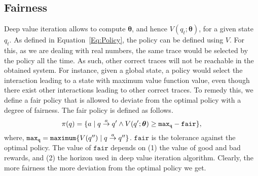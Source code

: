 


\subsection{Fairness}
Deep value iteration allows to compute $\bm{\theta}$, and hence $V(q_{t};\bm{\theta})$, for a given state $q_t$. As defined in Equation~\ref{Eq:Policy}, the policy can be defined using $V$. For this, as we are dealing with real numbers, the same trace would be selected by the policy all the time. As such, other correct traces will not be reachable in the obtained system. For instance, given a global state, a policy would select the interaction leading to a state with maximum value function value, even though there exist other interactions leading to other correct traces. To remedy this, we define a fair policy that is allowed to deviate from the optimal policy with a degree of fairness.  The fair policy is defined as follows. 
\begin{equation}
\label{Eq:Policy-fair}
\pi(q) = \{a \mid q \goesto[a] q' \wedge V(q';\bm{\theta}) \geq \mathtt{max_q} - \mathtt{fair}\},
\end{equation}
where, $\mathtt{max_q} = \mathtt{maximum}\{V(q'') \mid q \goesto[a] q''\}$.  $\mathtt{fair}$ is the tolerance against the optimal policy. The value of $\mathtt{fair}$ depends on (1) the value of good and bad rewards, and (2) the  horizon used in deep value iteration algorithm. Clearly, the more fairness the more deviation from the optimal policy we get. 